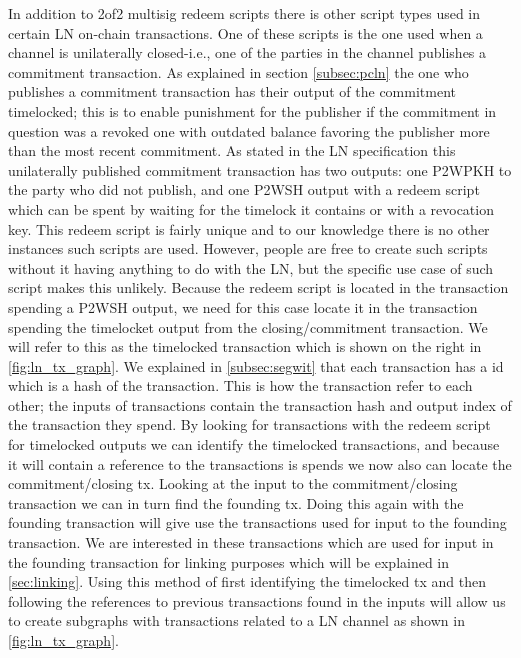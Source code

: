 In addition to 2of2 multisig redeem scripts there is other script types used in certain LN on-chain transactions. One of these scripts is the one used when a channel is unilaterally closed-i.e., one of the parties in the channel publishes a commitment transaction. As explained in section \cref{subsec:pcln} the one who publishes a commitment transaction has their output of the commitment timelocked; this is to enable punishment for the publisher if the commitment in question was a revoked one with outdated balance favoring the publisher more than the most recent commitment. As stated in the LN specification \cite{bolt3} this unilaterally published commitment transaction has two outputs: one P2WPKH to the party who did not publish, and one P2WSH output with a redeem script which can be spent by waiting for the timelock it contains or with a revocation key. 
This redeem script is fairly unique and to our knowledge there is no other instances such scripts are used. However, people are free to create such scripts without it having anything to do with the LN, but the specific use case of such script makes this unlikely. Because the redeem script is located in the transaction spending a P2WSH output, we need for this case locate it in the transaction spending the timelocket output from the closing/commitment transaction. We will refer to this as the timelocked transaction which is shown on the right in \cref{fig:ln_tx_graph}. We explained in \cref{subsec:segwit} that each transaction has a id which is a hash of the transaction. This is how the transaction refer to each other; the inputs of transactions contain the transaction hash and output index of the transaction they spend. By looking for transactions with the redeem script for timelocked outputs we can identify the timelocked transactions, and because it will contain a reference to the transactions is spends we now also can locate the commitment/closing tx. Looking at the input to the commitment/closing transaction we can in turn find the founding tx. Doing this again with the founding transaction will give use the transactions used for input to the founding transaction. We are interested in these transactions which are used for input in the founding transaction for linking purposes which will be explained in \cref{sec:linking}. Using this method of first identifying the timelocked tx and then following the references to previous transactions found in the inputs will allow us to create subgraphs with transactions related to a LN channel as shown in \cref{fig:ln_tx_graph}.


